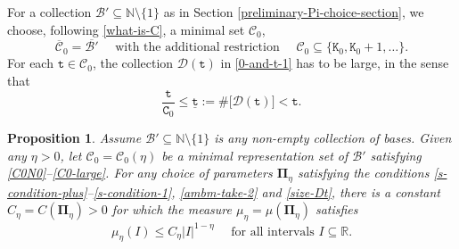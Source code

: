 \documentclass[12pt, twoside]{article}
\newtheorem{proposition}[theorem]{Proposition}
\theoremstyle{definition}
\numberwithin{equation}{section}
\begin{document}
For a collection $\mathscr{B}' \subseteq \mathbb N \setminus \{1\}$ as in Section \ref{preliminary-Pi-choice-section}, we choose, following \eqref{what-is-C}, a minimal set $\mathscr{C}_0$,     
\begin{equation} \label{C0-large}
 \overline{\mathscr{C}}_0 = \overline{\mathscr{B}'}  \quad \text{ with the additional restriction } \quad \mathscr{C}_0 \subseteq \bigl\{\mathtt K_0, \mathtt K_0+1, \ldots \bigr\}. 
\end{equation}
For each $\mathtt t \in \mathscr{C}_0$, the collection $\mathscr{D}(\mathtt t)$ in \eqref{0-and-t-1} has to be large, in the sense that   
\begin{equation} 
 \frac{\mathtt t}{\mathtt C_0}  \leq \underline{\mathtt t} := \# \bigl[\mathscr D(\mathtt t)\bigr] < \mathtt t. \label{size-Dt} 
\end{equation} 
\begin{proposition} \label{Frostman-prop} 
Assume $\mathscr{B}' \subseteq \mathbb N \setminus \{1\}$ is any non-empty collection of bases. Given any $\eta > 0$, let $\mathscr{C}_0 = \mathscr{C}_0 (\eta)$ be a minimal representation set of $\mathscr{B}'$ satisfying \eqref{C0N0}--\eqref{C0-large}. For any choice of parameters $\pmb{\Pi}_{\eta}$
satisfying the conditions \eqref{s-condition-plus}--\eqref{s-condition-1}, \eqref{ambm-take-2} and \eqref{size-Dt}, 
there is a constant $C_{\eta} = C(\pmb{\Pi}_\eta) > 0$ for which the measure $ \mu_{\eta} = \mu(\pmb{\Pi}_{\eta})$ satisfies
\begin{equation} \label{ball-condition-mu}
\mu_{\eta}(I) \leq C_{\eta} |I|^{1 - \eta} \quad \text{ for all intervals } I \subseteq \mathbb R. 
\end{equation} 
\end{proposition} 
\end{document}
